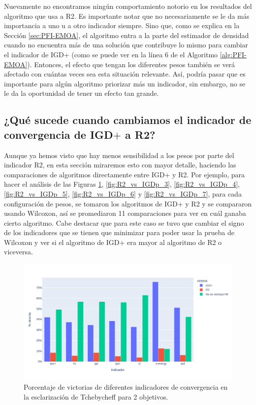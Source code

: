 Nuevamente no encontramos ningún comportamiento notorio en los resultados del algoritmo que usa a R2. Es importante notar que no necesariamente se le da más importancia a uno u a otro indicador siempre. Sino que, como se explica en la Sección \ref{sec:PFI-EMOA}, el algoritmo entra a la parte del estimador de densidad cuando no encuentra más de una solución que contribuye lo mismo para cambiar el indicador de IGD+ (como se puede ver en la línea 6 de el Algoritmo \ref{alg:PFI-EMOA}). Entonces, el efecto que tengan los diferentes pesos también se verá afectado con cuántas veces sea esta situación relevante. Así, podría pasar que es importante para algún algoritmo priorizar más un indicador, sin embargo, no se le da la oportunidad de tener un efecto tan grande.  


\subsection*{¿Qué sucede cuando cambiamos el indicador de convergencia de IGD$+$ a R2?}

Aunque ya hemos visto que hay menos sensibilidad a los pesos por parte del indicador R2, en esta sección miraremos esto con mayor detalle, haciendo las comparaciones de algoritmos directamente entre IGD+ y R2. Por ejemplo, para hacer el análisis de las Figuras \ref{fig:R2_vs_IGDp_2}, \ref{fig:R2_vs_IGDp_3}, \ref{fig:R2_vs_IGDp_4}, \ref{fig:R2_vs_IGDp_5}, \ref{fig:R2_vs_IGDp_6} y \ref{fig:R2_vs_IGDp_7}, para cada configuración de pesos, se tomaron los algoritmos de IGD+ y R2 y se compararon usando Wilcoxon, así se promediaron 11 comparaciones para ver en cuál ganaba cierto algoritmo. Cabe destacar que para este caso se tuvo que cambiar el signo de los indicadores que se tienen que minimizar para poder usar la prueba de Wilcoxon y ver si el algoritmo de IGD+ era mayor al algoritmo de R2 o viceversa.


\begin{figure} [H]
    \centering
\includegraphics[width=\textwidth]{Figuras/R2_vs_IGDp_nobj2.pdf}
\caption[IGD+ vs R2 2 objetivos]{Porcentaje de victorias de diferentes indicadores de convergencia en la esclarización de Tchebycheff para 2 objetivos.}
\label{fig:R2_vs_IGDp_2}
\end{figure}

